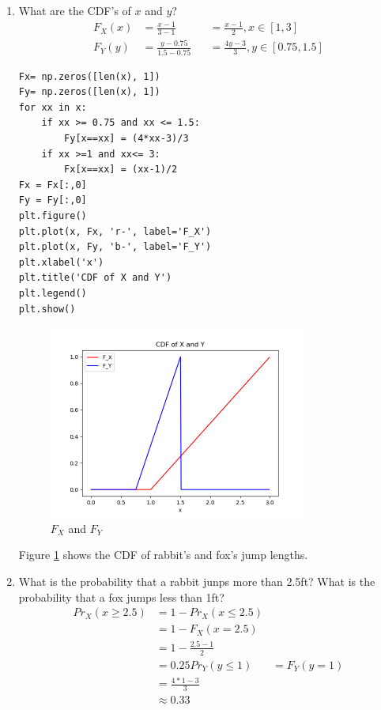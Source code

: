 \documentclass[preprint,12pt]{elsarticle}
\begin{document}
\begin{enumerate}
        \item What are the CDF's of $x$ and $y$?
        \begin{align*}
            F_X(x)  &= \frac{x-1}{3-1} &&= \frac{x-1}{2},x\in [1,3]\\
            F_Y(y)  &= \frac{y-0.75}{1.5-0.75} &&= \frac{4y - 3}{3}, y\in [0.75, 1.5]
        \end{align*}
        \begin{lstlisting}
Fx= np.zeros([len(x), 1])
Fy= np.zeros([len(x), 1])
for xx in x:
    if xx >= 0.75 and xx <= 1.5:
        Fy[x==xx] = (4*xx-3)/3
    if xx >=1 and xx<= 3:
        Fx[x==xx] = (xx-1)/2
Fx = Fx[:,0]
Fy = Fy[:,0]
plt.figure()
plt.plot(x, Fx, 'r-', label='F_X')
plt.plot(x, Fy, 'b-', label='F_Y')
plt.xlabel('x')
plt.title('CDF of X and Y')
plt.legend()
plt.show()
        \end{lstlisting}
        \begin{figure}[htbp!]
            \center
            \includegraphics[width=0.8\textwidth]{8.png}
            \caption{$F_X$ and $F_Y$}
            \label{fig:8}
        \end{figure}
        Figure \ref{fig:8} shows the CDF of rabbit's and fox's
        jump lengths.

        \item What is the probability that a rabbit junps more than 2.5ft?
        What is the probability that a fox jumps less than 1ft?
        \begin{align*}
            Pr_X(x\geq 2.5) &= 1 - Pr_X(x\leq 2.5)\\
                            &= 1 - F_X(x=2.5)\\
                            &= 1 - \frac{2.5-1}{2} \\
                            &= 0.25
            Pr_Y(y\leq 1)   &= F_Y(y=1)\\
                            &= \frac{4*1-3}{3}\\
                            &\approx 0.33
        \end{align*}


\end{enumerate}
\end{document}
